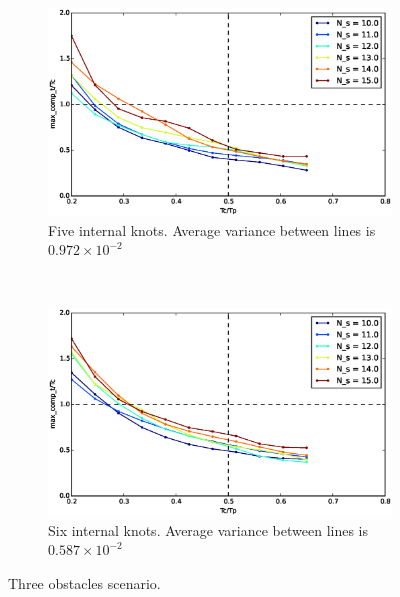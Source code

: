 \begin{figure}[!h]
        ~ %
        \begin{subfigure}[b]{0.48\textwidth}
                \includegraphics[width=\textwidth]{./images/realtime/Scenario_3__N_knots_5/mcttc-tctp.eps}
                \caption{Five internal knots. Average variance between lines is $0.972\times 10^{-2}$}\label{fig:uni35}
        \end{subfigure}
        ~ %
        \begin{subfigure}[b]{0.48\textwidth}
                \includegraphics[width=\textwidth]{./images/realtime/Scenario_3__N_knots_6/mcttc-tctp.eps}
                \caption{Six internal knots. Average variance between lines is $0.587\times 10^{-2}$}\label{fig:uni36}
        \end{subfigure}
        \caption{Three obstacles scenario.}\label{fig:uni3}
\end{figure}

